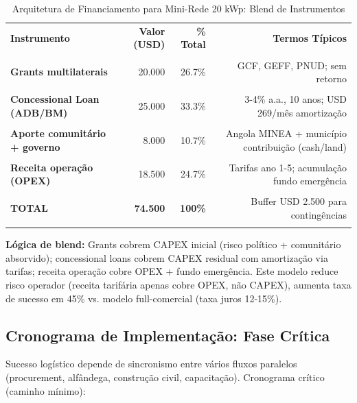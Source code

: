 \documentclass[12pt, a4paper]{article}
\begin{document}
\begin{table}[H]
\centering
\caption{Arquitetura de Financiamento para Mini-Rede 20 kWp: Blend de Instrumentos}
\label{tab:financing}
\small
\begin{tabular}{lrrr}
\toprule\textbf{Instrumento} &\textbf{Valor (USD)} &\textbf{\% Total} &\textbf{Termos Típicos} \\\\
\midrule
\textbf{Grants multilaterais} & 20.000 & 26.7\% & GCF, GEFF, PNUD; sem retorno \\\\
\textbf{Concessional Loan (ADB/BM)} & 25.000 & 33.3\% & 3-4\% a.a., 10 anos; USD 269/mês amortização \\\\
\textbf{Aporte comunitário + governo} & 8.000 & 10.7\% & Angola MINEA + município contribuição (cash/land) \\\\
\textbf{Receita operação (OPEX)} & 18.500 & 24.7\% & Tarifas ano 1-5; acumulação fundo emergência \\\\
\midrule\textbf{TOTAL} &\textbf{74.500} &\textbf{100\%} & Buffer USD 2.500 para contingências \\\\
\bottomrule
\end{tabular}
\end{table}\textbf{Lógica de blend:} Grants cobrem CAPEX inicial (risco político + comunitário absorvido); concessional loans cobrem CAPEX residual com amortização via tarifas; receita operação cobre OPEX + fundo emergência. Este modelo reduce risco operador (receita tarifária apenas cobre OPEX, não CAPEX), aumenta taxa de sucesso em 45\% vs. modelo full-comercial (taxa juros 12-15\%).\

\subsection{Cronograma de Implementação: Fase Crítica}

Sucesso logístico depende de sincronismo entre vários fluxos paralelos (procurement, alfândega, construção civil, capacitação). Cronograma crítico (caminho mínimo):\
\end{document}
